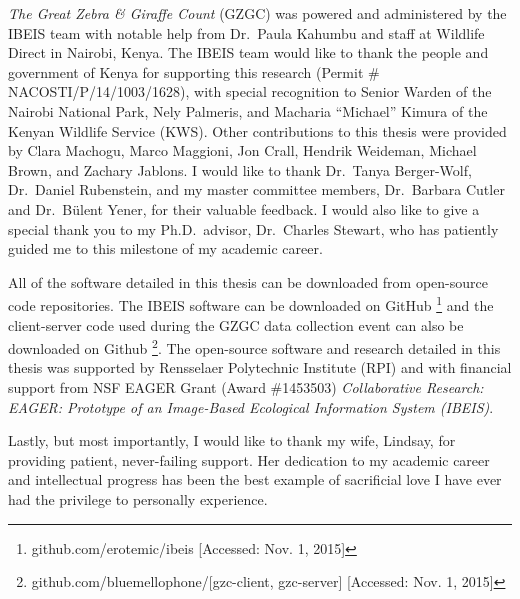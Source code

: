 

\textit{The Great Zebra \& Giraffe Count} (GZGC) was powered and administered by the IBEIS team with notable help from Dr.\ Paula Kahumbu and staff at Wildlife Direct in Nairobi, Kenya.  The IBEIS team would like to thank the people and government of Kenya for supporting this research (Permit \# NACOSTI/P/14/1003/1628), with special recognition to Senior Warden of the Nairobi National Park, Nely Palmeris, and Macharia ``Michael'' Kimura of the Kenyan Wildlife Service (KWS).  Other contributions to this thesis were provided by Clara Machogu, Marco Maggioni, Jon Crall, Hendrik Weideman, Michael Brown, and Zachary Jablons.  I would like to thank Dr.\ Tanya Berger-Wolf, Dr.\ Daniel Rubenstein, and my master committee members, Dr.\ Barbara Cutler and Dr.\ B{\"u}lent Yener, for their valuable feedback.  I would also like to give a special thank you to my Ph.D.\ advisor, Dr.\ Charles Stewart, who has patiently guided me to this milestone of my academic career.

All of the software detailed in this thesis can be downloaded from open-source code repositories.  The IBEIS software can be downloaded on GitHub \footnote{github.com/erotemic/ibeis [Accessed: Nov. 1, 2015]} and the client-server code used during the GZGC data collection event can also be downloaded on Github \footnote{github.com/bluemellophone/[gzc-client, gzc-server] [Accessed: Nov. 1, 2015]}.  The open-source software and research detailed in this thesis was supported by Rensselaer Polytechnic Institute (RPI) and with financial support from NSF EAGER Grant (Award \#1453503) \textit{Collaborative Research: EAGER: Prototype of an Image-Based Ecological Information System (IBEIS)}.

Lastly, but most importantly, I would like to thank my wife, Lindsay, for providing patient, never-failing support.  Her dedication to my academic career and intellectual progress has been the best example of sacrificial love I have ever had the privilege to personally experience.

\begin{figure}[!htb]%
    \centering
    \qquad
\end{figure}

